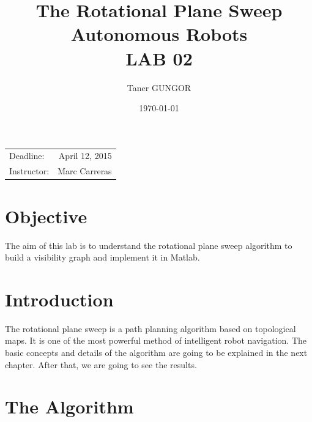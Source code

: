 \documentclass{article}
\title{The Rotational Plane Sweep \\ Autonomous Robots \\ LAB 02} %
\author{Taner \textsc{GUNGOR}} %
\date{\today} %
\begin{document}
\maketitle %

\begin{center}
\begin{tabular}{l r}
Deadline: & April 12, 2015 \\ %
Instructor: & Marc Carreras %
\end{tabular}
\end{center}




\section{Objective}

The aim of this lab is to understand the rotational plane sweep algorithm to build a visibility graph and implement it in Matlab.

\section{Introduction}

The rotational plane sweep is a path planning algorithm based on topological maps. It is one of the most powerful method of intelligent robot navigation. The basic concepts and details of the algorithm are going to be explained in the next chapter. After that, we are going to see the results.



\section{The Algorithm}
\end{document}
